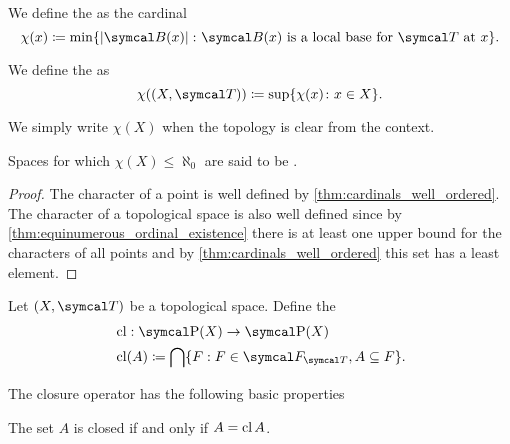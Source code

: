 \begin{definition}\label{def:topological_space_character}
  We define the  as the cardinal
  \begin{equation*}
    \chi(x) \coloneqq \min \{ \Abs{\Cal{B(x)}} \colon \Cal{B(x)} \text{ is a local base for } \Cal{T} \text{ at } x \}.
  \end{equation*}

  We define the  as
  \begin{equation*}
    \chi((X, \Cal{T})) \coloneqq \sup \{ \chi(x) \colon x \in X \}.
  \end{equation*}

  We simply write \( \chi(X) \) when the topology is clear from the context.

  Spaces for which \( \chi(X) \leq \aleph_0 \) are said to be .
\end{definition}
\begin{proof}
  The character of a point is well defined by \cref{thm:cardinals_well_ordered}. The character of a topological space is also well defined since by \cref{thm:equinumerous_ordinal_existence} there is at least one upper bound for the characters of all points and by \cref{thm:cardinals_well_ordered} this set has a least element.
\end{proof}

\begin{definition}\label{def:closure_operator}\cite[33]{Engelking1989}
  Let \( (X, \Cal{T}) \) be a topological space. Define the 
  \begin{align*}
    &\Cl: \Power(X) \to \Power(X) \\
    &\Cl(A) \coloneqq \bigcap \{ F : F \in \Cal{F}_{\Cal{T}}, A \subseteq F \}.
  \end{align*}
\end{definition}

\begin{proposition}\label{thm:closure_operator_properties}
  The closure operator has the following basic properties
  \begin{thmenum}
     The set \( A \) is closed if and only if \( A = \operatorname{cl} A \).
  \end{thmenum}
\end{proposition}


